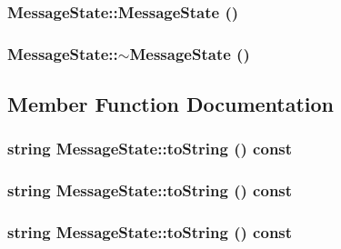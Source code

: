 \hypertarget{classMessageState_ad9003377a5ab63ece9eedd35bae105e}{
\subsubsection[{MessageState}]{\setlength{\rightskip}{0pt plus 5cm}MessageState::MessageState ()}}
\label{classMessageState_ad9003377a5ab63ece9eedd35bae105e}


\hypertarget{classMessageState_5ad0eb922535da32b91d990e64843ec2}{
\subsubsection[{$\sim$MessageState}]{\setlength{\rightskip}{0pt plus 5cm}MessageState::$\sim$MessageState ()}}
\label{classMessageState_5ad0eb922535da32b91d990e64843ec2}




\subsection{Member Function Documentation}
\hypertarget{classMessageState_16ae858ec7ab2042f10cb92f1f4dbd7a}{
\subsubsection[{toString}]{\setlength{\rightskip}{0pt plus 5cm}string MessageState::toString () const}}
\label{classMessageState_16ae858ec7ab2042f10cb92f1f4dbd7a}


\hypertarget{classMessageState_16ae858ec7ab2042f10cb92f1f4dbd7a}{
\subsubsection[{toString}]{\setlength{\rightskip}{0pt plus 5cm}string MessageState::toString () const}}
\label{classMessageState_16ae858ec7ab2042f10cb92f1f4dbd7a}


\hypertarget{classMessageState_16ae858ec7ab2042f10cb92f1f4dbd7a}{
\subsubsection[{toString}]{\setlength{\rightskip}{0pt plus 5cm}string MessageState::toString () const}}
\label{classMessageState_16ae858ec7ab2042f10cb92f1f4dbd7a}




